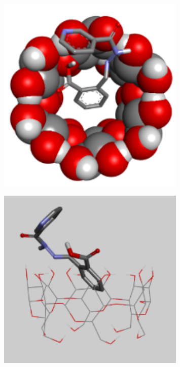 \begin{figure}[H]
	\centering
	\includegraphics[width=0.8\textwidth]{media/chem2/image35}
	\caption*{}
\end{figure}

\begin{figure}[H]
	\centering
	\includegraphics[width=0.8\textwidth]{media/chem2/image36}
	\caption*{}
\end{figure}

